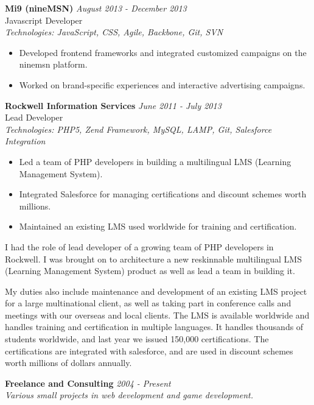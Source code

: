 \documentclass[a4paper,10pt]{article}
\begin{document}
\vspace{1em}

\textbf{Mi9 (nineMSN)} \hfill \textit{August 2013 - December 2013} \\
Javascript Developer \\
\textit{Technologies: JavaScript, CSS, Agile, Backbone, Git, SVN}
\begin{itemize}
    \item Developed frontend frameworks and integrated customized campaigns on the ninemsn platform.
    \item Worked on brand-specific experiences and interactive advertising campaigns.
\end{itemize}

\vspace{1em}

\textbf{Rockwell Information Services} \hfill \textit{June 2011 - July 2013} \\
Lead Developer \\
\textit{Technologies: PHP5, Zend Framework, MySQL, LAMP, Git, Salesforce Integration}
\begin{itemize}
    \item Led a team of PHP developers in building a multilingual LMS (Learning Management System).
    \item Integrated Salesforce for managing certifications and discount schemes worth millions.
    \item Maintained an existing LMS used worldwide for training and certification.
\end{itemize}

I had the role of lead developer of a growing team of PHP developers in Rockwell. I was brought on to architecture a new reskinnable multilingual LMS (Learning Management System) product as well as lead a team in building it.

My duties also include maintenance and development of an existing LMS project for a large multinational client, as well as taking part in conference calls and meetings with our overseas and local clients. The LMS is available worldwide and handles training and certification in multiple languages. It handles thousands of students worldwide, and last year we issued 150,000 certifications. The certifications are integrated with salesforce, and are used in discount schemes worth millions of dollars annually.

\vspace{1em}

\textbf{Freelance and Consulting} \hfill \textit{2004 - Present} \\
\textit{Various small projects in web development and game development.}
\end{document}
